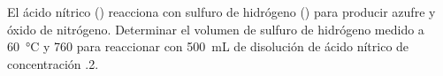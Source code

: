 El ácido nítrico () reacciona con sulfuro de hidrógeno () para producir azufre y óxido de nitrógeno. Determinar el volumen de sulfuro de hidrógeno medido a \SI{60}{\celsius} y \SI{760}{\torr} para reaccionar con \SI{500}{\milli\liter} de disolución de ácido nítrico de concentración \SI{,2}{\Molar}.

